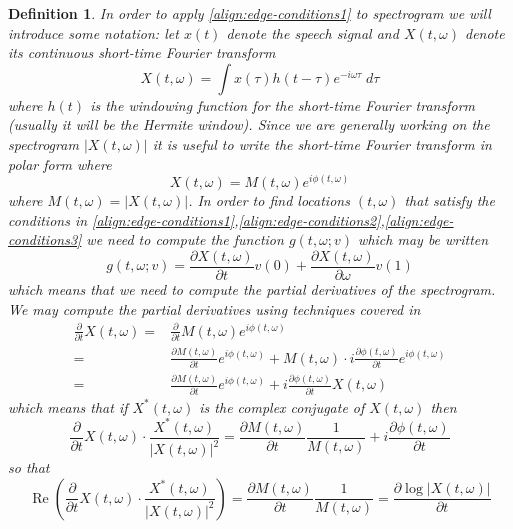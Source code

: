 \documentclass[english]{article}
\newtheorem{defn}{Definition}[section]
\begin{document}
\begin{defn}
In order to apply \autoref{align:edge-conditions1} to spectrogram we will introduce some notation: let
$x(t)$ denote the speech signal and $X(t,\omega)$ denote its continuous short-time Fourier transform
\begin{equation}\label{eq:continuous-FT}
X(t,\omega) = \int x(\tau)h(t-\tau)e^{-i\omega \tau}\; d\tau
\end{equation}
where $h(t)$ is the windowing function for the short-time Fourier transform (usually it will be the
Hermite window).  Since we are generally working on the spectrogram $|X(t,\omega)|$ it is useful to
write the short-time Fourier transform in polar form where
\begin{equation}
X(t,\omega)= M(t,\omega)e^{i\phi(t,\omega)}
\end{equation}
where $M(t,\omega)=|X(t,\omega)|$.  In order to find locations $(t,\omega)$ that satisfy
the conditions in \autoref{align:edge-conditions1},\autoref{align:edge-conditions2},\autoref{align:edge-conditions3}
we need to compute the function $g(t,\omega ; v)$ which may be written
\begin{equation}
g(t,\omega ; v) = \frac{\partial X(t,\omega)}{\partial t} v(0) + \frac{\partial X(t,\omega)}{\partial \omega} v(1)
\end{equation} which means that we need to compute
the partial derivatives of the spectrogram. We may compute the partial derivatives using techniques
covered in  \cite{fitzfulop2009}
\begin{align*}
\frac{\partial}{\partial t} X(t,\omega) =& \frac{\partial}{\partial t} M(t,\omega) e^{i\phi(t,\omega)}\\
=& \frac{\partial M(t,\omega) }{\partial t} e^{i\phi(t,\omega)} + M(t,\omega)\cdot i \frac{\partial \phi(t,\omega) }{\partial t} e^{i\phi(t,\omega)}\\
=& \frac{\partial M(t,\omega) }{\partial t} e^{i\phi(t,\omega)} +  i \frac{\partial \phi(t,\omega) }{\partial t} X(t,\omega)
\end{align*}
which means that if $X^*(t,\omega)$ is the complex conjugate of $X(t,\omega)$ then
\begin{equation}
\frac{\partial}{\partial t} X(t,\omega) \cdot \frac{X^*(t,\omega)}{|X(t,\omega)|^2} = \frac{\partial M(t,\omega) }{\partial t}  \frac{1}{M(t,\omega)} +  i \frac{\partial \phi(t,\omega) }{\partial t}
\end{equation}
so that
\begin{equation}
\operatorname{Re}\left(\frac{\partial}{\partial t} X(t,\omega) \cdot \frac{X^*(t,\omega)}{|X(t,\omega)|^2}\right) = \frac{\partial M(t,\omega) }{\partial t}  \frac{1}{M(t,\omega)} = \frac{\partial \log |X(t,\omega)| }{\partial t}

\end{equation}
\end{defn}
\end{document}
